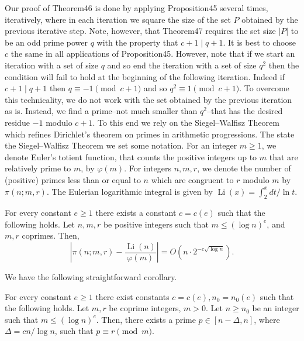 Our proof of Theorem46 is done by applying Proposition45 several times, iteratively, where in each iteration we square the size of the set $P$ obtained by the previous iterative step. Note, however, that Theorem47 requires the set size $|P|$ to be an odd prime power $q$ with the property that $c+1\mid q+1$. It is best to choose $c$ the same in all applications of Proposition45. However, note that if we start an iteration with a set of size $q$ and so end the iteration with a set of size $q^2$ then the condition will fail to hold at the beginning of the following iteration. Indeed if $c+1\mid q+1$ then $q\equiv-1\pmod{c+1}$ and so $q^2\equiv1\pmod{c+1}$. To overcome this technicality, we do not work with the set obtained by the previous iteration as is. Instead, we find a prime--not much smaller than $q^2$--that has the desired residue $-1$ modulo $c+1$. To this end we rely on the Siegel--Walfisz Theorem~\cite{ref34,ref37} which refines Dirichlet's theorem on primes in arithmetic progressions. The state the Siegel--Walfisz Theorem we set some notation. For an integer $m\geq1$, we denote Euler's totient function, that counts the positive integers up to $m$ that are relatively prime to $m$, by $\varphi(m)$. For integers $n,m,r$, we denote the number of (positive) primes less than or equal to $n$ which are congruent to $r$ modulo $m$ by $\pi(n;m,r)$. The Eulerian logarithmic integral is given by $\operatorname{Li}(x)=\int_2^x dt/\ln t$.
\begin{nttheorem}
For every constant $e\geq1$ there exists a constant $c=c(e)$ such that the following holds. Let $n,m,r$ be positive integers such that $m\leq(\log n)^e$, and $m,r$ coprimes. Then,
\[\left|\pi(n;m,r)-\frac{\operatorname{Li}(n)}{\varphi(m)}\right|=O\left(n\cdot2^{-c\sqrt{\log n}}\right).\]
\end{nttheorem}
We have the following straightforward corollary.
\begin{nttheorem}
For every constant $e\geq1$ there exist constants $c=c(e),n_0=n_0(e)$ such that the following holds. Let $m,r$ be coprime integers, $m>0$. Let $n\geq n_0$ be an integer such that $m\leq(\log n)^e$. Then, there exists a prime $p\in[n-\Delta,n]$, where $\Delta=cn/\log n$, such that $p\equiv r\pmod m$.
\end{nttheorem}
